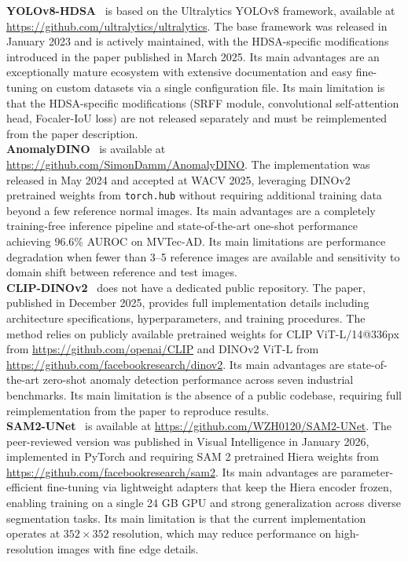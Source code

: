 \documentclass[11pt]{article}
\begin{document}
\textbf{YOLOv8-HDSA}~\cite{Shi2025CarbonBlock} is based on the Ultralytics YOLOv8 
framework, available at \url{https://github.com/ultralytics/ultralytics}. The base 
framework was released in January 2023 and is actively maintained, with the 
HDSA-specific modifications introduced in the paper published in March 2025. Its 
main advantages are an exceptionally mature ecosystem with extensive documentation 
and easy fine-tuning on custom datasets via a single configuration file. Its main 
limitation is that the HDSA-specific modifications (SRFF module, convolutional 
self-attention head, Focaler-IoU loss) are not released separately and must be 
reimplemented from the paper description.\\

\textbf{AnomalyDINO}~\cite{Damm2024AnomalyDINO} is available at 
\url{https://github.com/SimonDamm/AnomalyDINO}. The implementation was released in 
May 2024 and accepted at WACV 2025, leveraging DINOv2 pretrained weights from 
\texttt{torch.hub} without requiring additional training data beyond a few reference 
normal images. Its main advantages are a completely training-free inference pipeline 
and state-of-the-art one-shot performance achieving $96.6\%$ AUROC on MVTec-AD. Its 
main limitations are performance degradation when fewer than 3--5 reference images 
are available and sensitivity to domain shift between reference and test images.\\

\textbf{CLIP-DINOv2}~\cite{Jiang2025CLIPDINO} does not have a dedicated public 
repository. The paper, published in December 2025, provides full implementation 
details including architecture specifications, hyperparameters, and training 
procedures. The method relies on publicly available pretrained weights for CLIP 
ViT-L/14@336px from \url{https://github.com/openai/CLIP} and DINOv2 ViT-L from 
\url{https://github.com/facebookresearch/dinov2}. Its main advantages are 
state-of-the-art zero-shot anomaly detection performance across seven industrial 
benchmarks. Its main limitation is the absence of a public codebase, requiring full 
reimplementation from the paper to reproduce results.\\

\textbf{SAM2-UNet}~\cite{Xiong2026SAM2UNet} is available at 
\url{https://github.com/WZH0120/SAM2-UNet}. The peer-reviewed version was published 
in Visual Intelligence in January 2026, implemented in PyTorch and requiring SAM 2 
pretrained Hiera weights from \url{https://github.com/facebookresearch/sam2}. Its 
main advantages are parameter-efficient fine-tuning via lightweight adapters that 
keep the Hiera encoder frozen, enabling training on a single 24 GB GPU and strong 
generalization across diverse segmentation tasks. Its main limitation is that the 
current implementation operates at $352\times352$ resolution, which may reduce 
performance on high-resolution images with fine edge details.\\
\end{document}
